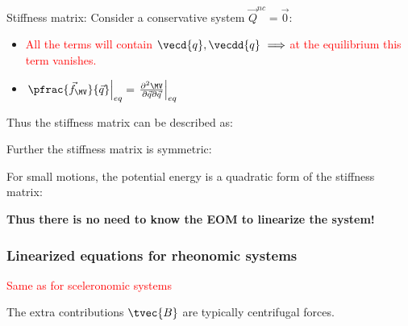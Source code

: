 \documentclass[10pt,a4paper]{scrartcl}
\begin{document}
\begin{multicols*}{2}
Stiffness matrix: Consider a conservative system $\vec{Q}^{nc}=\vec{0}$:


\begin{itemize}
\item \textcolor{red}{All the terms will contain $\vecd{q},\vecdd{q}\ \Longrightarrow$ at the equilibrium this term vanishes.}
\item \textcolor{green}{$\left.\pfrac{\vec{f}_\MV}{\vec{q}}\right|_{eq}=\left.\frac{\partial^2\MV}{\partial\vec{q}\partial\vec{q}}\right|_{eq}$}
\end{itemize}

Thus the stiffness matrix can be described as:


Further the stiffness matrix is symmetric:


For small motions, the potential energy is a quadratic form of the stiffness matrix:


\textbf{Thus there is no need to know the EOM to linearize the system!}

\subsubsection{Linearized equations for rheonomic systems}


\textcolor{red}{Same as for sceleronomic systems}

The extra contributions $\tvec{B}$ are typically centrifugal forces.


\end{multicols*}
\end{document}
